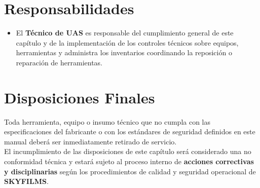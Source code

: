 \section{Responsabilidades}

\begin{itemize}
    \item El \textbf{Técnico de UAS} es responsable del cumplimiento general de este capítulo y de la implementación de los controles técnicos sobre equipos, herramientas y administra los inventarios coordinando la reposición o reparación de herramientas.
\end{itemize}

\section{Disposiciones Finales}

Toda herramienta, equipo o insumo técnico que no cumpla con las especificaciones del fabricante o con los estándares de seguridad definidos en este manual deberá ser inmediatamente retirado de servicio.\\

El incumplimiento de las disposiciones de este capítulo será considerado una no conformidad técnica y estará sujeto al proceso interno de \textbf{acciones correctivas y disciplinarias} según los procedimientos de calidad y seguridad operacional de \textbf{SKYFILMS}.

